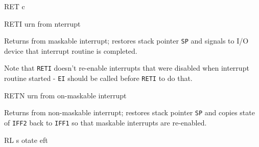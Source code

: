 \begin{basedescript}{
    \desclabelstyle{\multilinelabel}
    \desclabelwidth{3cm}}
\begin{DetailItem}{RET c}
        \begin{DetailTiming}
        \end{DetailTiming}

    \end{DetailItem}

    \begin{DetailItem}{RETI}
        {urn from nterrupt}
        {\SymRETI}

        Returns from maskable interrupt; restores stack pointer {\tt SP} and signals to I/O device that interrupt routine is completed.
		
        Note that {\tt RETI} doesn't re-enable interrupts that were disabled when interrupt routine started - {\tt EI} should be called before {\tt RETI} to do that.

        \begin{DetailEffects}
            \FlagsRETI
        \end{DetailEffects}
				
        \begin{DetailTiming}
        \end{DetailTiming}

    \end{DetailItem}

    \begin{DetailItem}{RETN}
        {urn from on-maskable interrupt}
        {\SymRETN}

        Returns from non-maskable interrupt; restores stack pointer {\tt SP} and copies state of {\tt IFF2} back to {\tt IFF1} so that maskable interrupts are re-enabled.

        \begin{DetailEffects}
            \FlagsRETN
        \end{DetailEffects}
				
        \begin{DetailTiming}
        \end{DetailTiming}

    \end{DetailItem}

    \begin{DetailItem}{RL s}
        {otate eft}
        {}


\end{DetailItem}
\end{basedescript}
